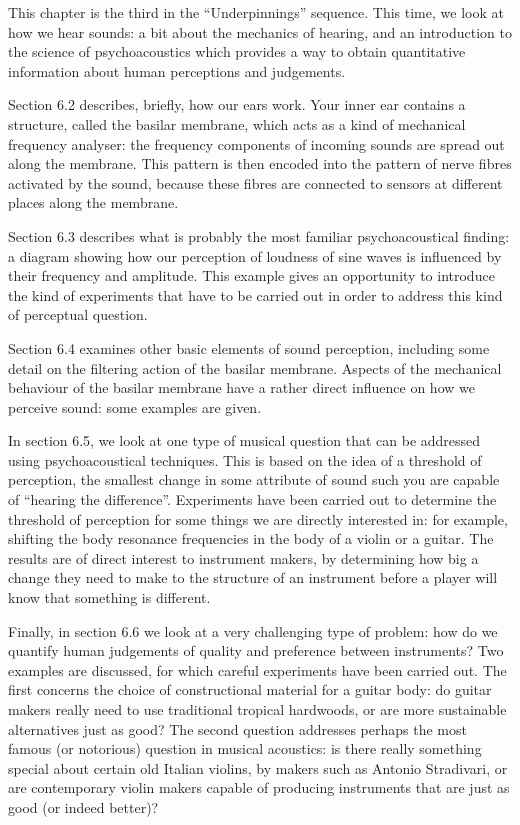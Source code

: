   This chapter is the third in the ``Underpinnings'' sequence. This time, we 
  look at how we hear sounds: a bit about the mechanics of hearing, and an 
  introduction to the science of psychoacoustics which provides a way to obtain 
  quantitative information about human perceptions and judgements. 

  Section 6.2 describes, briefly, how our ears work. Your inner ear contains a 
  structure, called the basilar membrane, which acts as a kind of mechanical 
  frequency analyser: the frequency components of incoming sounds are spread 
  out along the membrane. This pattern is then encoded into the pattern of 
  nerve fibres activated by the sound, because these fibres are connected to 
  sensors at different places along the membrane. 

  Section 6.3 describes what is probably the most familiar psychoacoustical 
  finding: a diagram showing how our perception of loudness of sine waves is 
  influenced by their frequency and amplitude. This example gives an 
  opportunity to introduce the kind of experiments that have to be carried out 
  in order to address this kind of perceptual question. 

  Section 6.4 examines other basic elements of sound perception, including some 
  detail on the filtering action of the basilar membrane. Aspects of the 
  mechanical behaviour of the basilar membrane have a rather direct influence 
  on how we perceive sound: some examples are given. 

  In section 6.5, we look at one type of musical question that can be addressed 
  using psychoacoustical techniques. This is based on the idea of a threshold 
  of perception, the smallest change in some attribute of sound such you are 
  capable of ``hearing the difference''. Experiments have been carried out to 
  determine the threshold of perception for some things we are directly 
  interested in: for example, shifting the body resonance frequencies in the 
  body of a violin or a guitar. The results are of direct interest to 
  instrument makers, by determining how big a change they need to make to the 
  structure of an instrument before a player will know that something is 
  different. 

  Finally, in section 6.6 we look at a very challenging type of problem: how do 
  we quantify human judgements of quality and preference between instruments? 
  Two examples are discussed, for which careful experiments have been carried 
  out. The first concerns the choice of constructional material for a guitar 
  body: do guitar makers really need to use traditional tropical hardwoods, or 
  are more sustainable alternatives just as good? The second question addresses 
  perhaps the most famous (or notorious) question in musical acoustics: is 
  there really something special about certain old Italian violins, by makers 
  such as Antonio Stradivari, or are contemporary violin makers capable of 
  producing instruments that are just as good (or indeed better)? 

